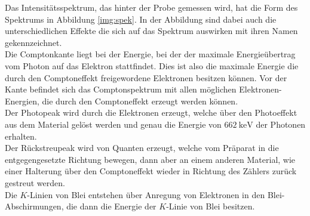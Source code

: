 \noindent
Das Intensitätsspektrum, das hinter der Probe gemessen wird, hat die Form des Spektrums in Abbildung \ref{img:spek}. 
In der Abbildung sind dabei auch die unterschiedlichen Effekte die sich auf das Spektrum auswirken mit ihren Namen gekennzeichnet.\\
Die Comptonkante liegt bei der Energie, bei der der maximale Energieübertrag vom Photon auf das Elektron stattfindet. 
Dies ist also die maximale Energie die durch den Comptoneffekt freigewordene Elektronen besitzen können. 
Vor der Kante befindet sich das Comptonspektrum mit allen möglichen Elektronen-Energien, die durch den Comptoneffekt erzeugt werden können.\\
Der Photopeak wird durch die Elektronen erzeugt, welche über den Photoeffekt aus dem Material gelöst werden und genau die Energie von $\SI{662}{\kilo\electronvolt}$ der Photonen erhalten.\\
Der Rückstreupeak wird von Quanten erzeugt, welche vom Präparat in die entgegengesetzte Richtung bewegen, dann aber an einem anderen Material, wie einer Halterung über den Comptoneffekt wieder in Richtung des Zählers zurück gestreut werden.\\
Die $K$-Linien von Blei entstehen über Anregung von Elektronen in den Blei-Abschirmungen, die dann die Energie der $K$-Linie von Blei besitzen.


